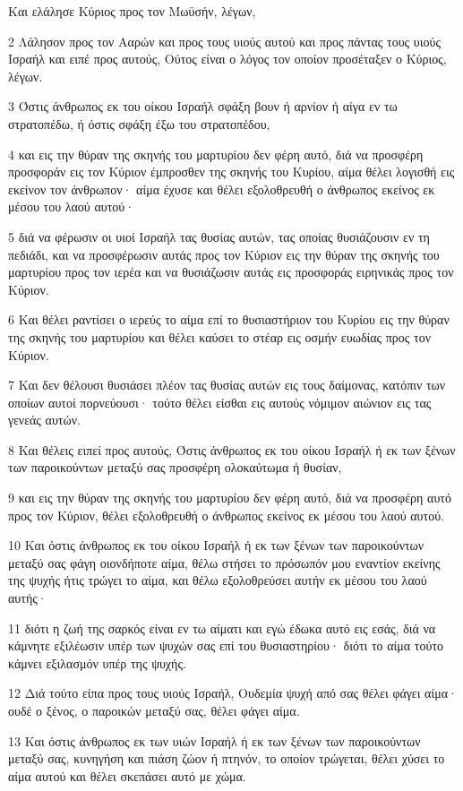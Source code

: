 \par Και ελάλησε Κύριος προς τον Μωϋσήν, λέγων,
\par 2 Λάλησον προς τον Ααρών και προς τους υιούς αυτού και προς πάντας τους υιούς Ισραήλ και ειπέ προς αυτούς, Ούτος είναι ο λόγος τον οποίον προσέταξεν ο Κύριος, λέγων.
\par 3 Όστις άνθρωπος εκ του οίκου Ισραήλ σφάξη βουν ή αρνίον ή αίγα εν τω στρατοπέδω, ή όστις σφάξη έξω του στρατοπέδου,
\par 4 και εις την θύραν της σκηνής του μαρτυρίου δεν φέρη αυτό, διά να προσφέρη προσφοράν εις τον Κύριον έμπροσθεν της σκηνής του Κυρίου, αίμα θέλει λογισθή εις εκείνον τον άνθρωπον· αίμα έχυσε και θέλει εξολοθρευθή ο άνθρωπος εκείνος εκ μέσου του λαού αυτού·
\par 5 διά να φέρωσιν οι υιοί Ισραήλ τας θυσίας αυτών, τας οποίας θυσιάζουσιν εν τη πεδιάδι, και να προσφέρωσιν αυτάς προς τον Κύριον εις την θύραν της σκηνής του μαρτυρίου προς τον ιερέα και να θυσιάζωσιν αυτάς εις προσφοράς ειρηνικάς προς τον Κύριον.
\par 6 Και θέλει ραντίσει ο ιερεύς το αίμα επί το θυσιαστήριον του Κυρίου εις την θύραν της σκηνής του μαρτυρίου και θέλει καύσει το στέαρ εις οσμήν ευωδίας προς τον Κύριον.
\par 7 Και δεν θέλουσι θυσιάσει πλέον τας θυσίας αυτών εις τους δαίμονας, κατόπιν των οποίων αυτοί πορνεύουσι· τούτο θέλει είσθαι εις αυτούς νόμιμον αιώνιον εις τας γενεάς αυτών.
\par 8 Και θέλεις ειπεί προς αυτούς, Όστις άνθρωπος εκ του οίκου Ισραήλ ή εκ των ξένων των παροικούντων μεταξύ σας προσφέρη ολοκαύτωμα ή θυσίαν,
\par 9 και εις την θύραν της σκηνής του μαρτυρίου δεν φέρη αυτό, διά να προσφέρη αυτό προς τον Κύριον, θέλει εξολοθρευθή ο άνθρωπος εκείνος εκ μέσου του λαού αυτού.
\par 10 Και όστις άνθρωπος εκ του οίκου Ισραήλ ή εκ των ξένων των παροικούντων μεταξύ σας φάγη οιονδήποτε αίμα, θέλω στήσει το πρόσωπόν μου εναντίον εκείνης της ψυχής ήτις τρώγει το αίμα, και θέλω εξολοθρεύσει αυτήν εκ μέσου του λαού αυτής·
\par 11 διότι η ζωή της σαρκός είναι εν τω αίματι και εγώ έδωκα αυτό εις εσάς, διά να κάμνητε εξιλέωσιν υπέρ των ψυχών σας επί του θυσιαστηρίου· διότι το αίμα τούτο κάμνει εξιλασμόν υπέρ της ψυχής.
\par 12 Διά τούτο είπα προς τους υιούς Ισραήλ, Ουδεμία ψυχή από σας θέλει φάγει αίμα· ουδέ ο ξένος, ο παροικών μεταξύ σας, θέλει φάγει αίμα.
\par 13 Και όστις άνθρωπος εκ των υιών Ισραήλ ή εκ των ξένων των παροικούντων μεταξύ σας, κυνηγήση και πιάση ζώον ή πτηνόν, το οποίον τρώγεται, θέλει χύσει το αίμα αυτού και θέλει σκεπάσει αυτό με χώμα.
